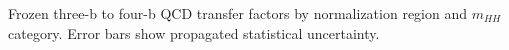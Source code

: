 Frozen three-b to four-b QCD transfer factors by normalization region and $m_{HH}$ category. Error bars show propagated statistical uncertainty.
